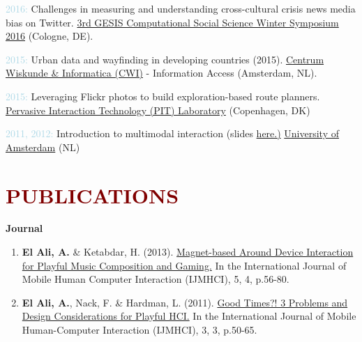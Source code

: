 \documentclass{article}
\newenvironment{innerlist}[1][\enskip\textbullet]%
        {\begin{compactenum}[#1]}{\end{compactenum}}
\begin{document}
\begin{innerlist}[-]
\item \textcolor{lightblue}{2016:} Challenges in measuring and understanding cross-cultural crisis news media bias on Twitter. \href{http://www.gesis.org/css-wintersymposium/home/}{3rd GESIS Computational Social Science Winter Symposium 2016} (Cologne, DE). 

\item \textcolor{lightblue}{2015:} Urban data and wayfinding in developing countries (2015). \href{https://www.cwi.nl/research-groups/Information-Access}{Centrum Wiskunde \& Informatica (CWI)} - Information Access (Amsterdam, NL). 

\item \textcolor{lightblue}{2015:} Leveraging Flickr photos to build exploration-based route planners. \href{https://pitlab.itu.dk/}{Pervasive Interaction Technology (PIT) Laboratory} (Copenhagen, DK)

\item \textcolor{lightblue}{2011, 2012:} Introduction to multimodal interaction (slides \href{http://www.slideshare.net/Abd0/multimodal-interaction-an-introduction}{here.)} \href{http://www.uva.nl/en/home}{University of Amsterdam} (NL)
\end{innerlist}


\section*{\textcolor{maroon}{\normalsize PUBLICATIONS}} 

\textbf{Journal}

\begin{enumerate}

\item  \textbf{El Ali, A.} \& Ketabdar, H. (2013). \href{http://abdoelali.com/pdfs/ijmhci_ADI_play_preprint.pdf}{Magnet-based Around Device Interaction for Playful Music Composition and Gaming.} In the International Journal of Mobile Human Computer Interaction (IJMHCI), 5, 4, p.56-80.

\item  \textbf{El Ali, A.}, Nack, F. \& Hardman, L. (2011). \href{http://www.igi-global.com/article/good-times-problems-design-considerations/55395}{Good Times?! 3 Problems and Design Considerations for Playful HCI.} In the International Journal of Mobile Human-Computer Interaction (IJMHCI), 3, 3, p.50-65. 

\end{enumerate}
\end{document}
